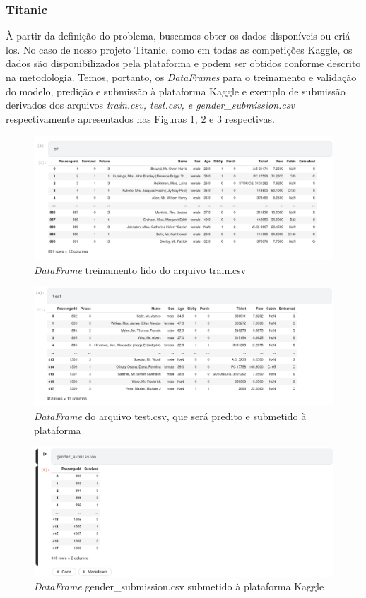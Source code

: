 \documentclass{article}
\begin{document}
 \subsubsection{Titanic}
À partir da definição do problema, buscamos obter os dados disponíveis ou criá-los. No caso de nosso projeto Titanic, como em todas as competições Kaggle, os dados são disponibilizados pela plataforma e podem ser obtidos conforme descrito na metodologia. Temos, portanto, os \emph{DataFrames}  para o treinamento e validação do modelo, predição e submissão à plataforma Kaggle e exemplo de submissão derivados dos arquivos \emph{train.csv, test.csv, e gender\_submission.csv} respectivamente apresentados nas Figuras \ref{df.csv}, \ref{test.csv} e \ref{gender.submission.csv} respectivas. 
\begin{figure}[H]
\centering
\includegraphics[width=\textwidth]{Figures/df.png}
\caption{\emph{DataFrame} treinamento lido do arquivo train.csv}
\label{df.csv}
\end{figure}
\begin{figure}[H]
\centering
\includegraphics[width=\textwidth]{Figures/test.png}
\caption{\emph{DataFrame} do arquivo test.csv, que será predito e submetido à plataforma}
\label{test.csv}
\end{figure}
\begin{figure}[H]
\centering
\includegraphics[width=\textwidth]{Figures/gender_submission.png}
\caption{\emph{DataFrame} gender\_submission.csv submetido à plataforma Kaggle}
\label{gender.submission.csv}
\end{figure}
\end{document}
